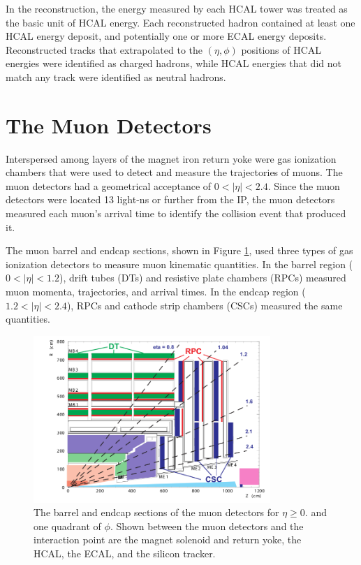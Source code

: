 In the reconstruction, the energy measured by each HCAL tower was treated as the basic unit of HCAL energy.  
Each reconstructed hadron contained at least one HCAL energy deposit, and potentially one or more ECAL energy 
deposits.  Reconstructed tracks that extrapolated to the $(\eta,\phi)$ positions of HCAL energies were identified 
as charged hadrons, while HCAL energies that did not match any track were identified as neutral hadrons.


\section{The Muon Detectors}
\label{sec:muonDetectorsDescription}
Interspersed among layers of the magnet iron return yoke were gas ionization chambers that were used to detect and measure the 
trajectories of muons.  The muon detectors had a geometrical acceptance of $0 < |\eta| < 2.4$.  Since the muon detectors were 
located 13 light-ns or further from the IP, the muon detectors measured each muon's arrival time to identify the collision event that produced it.

The muon barrel and endcap sections, shown in Figure \ref{fig:muonBarrelAndEndcapDetectors}, used three types of 
gas ionization detectors to measure muon kinematic quantities.  In the barrel region ($0 < |\eta| < 1.2$), 
drift tubes (DTs) and resistive plate chambers (RPCs) measured muon momenta, trajectories, and arrival times.  In 
the endcap region ($1.2 < |\eta| < 2.4$), RPCs and cathode strip chambers (CSCs) measured the same quantities.

\begin{figure}[ht]
	\centering
	\includegraphics[width=0.8\textwidth]{figures/muonDetectorLayout.png}
	\caption{The barrel and endcap sections of the muon detectors for $\eta \geq 0.$ and one quadrant of $\phi$.  Shown 
		between the muon detectors and the interaction point are the magnet solenoid and return yoke, the HCAL, the ECAL, 
		and the silicon tracker.}
	\label{fig:muonBarrelAndEndcapDetectors}
\end{figure}

